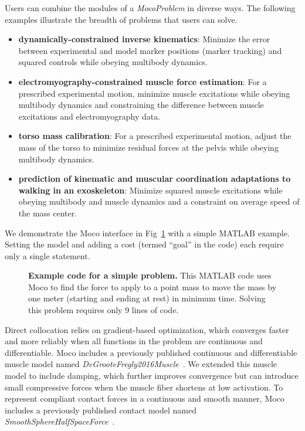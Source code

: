 \documentclass[10pt,letterpaper]{article}
\begin{document}
Users can combine the modules of a \textit{MocoProblem} in diverse ways. The following examples illustrate the breadth of problems that users can solve.
\begin{itemize}
\item \textbf{dynamically-constrained inverse kinematics}: Minimize the error between experimental and model marker positions (marker tracking) and squared controls while obeying multibody dynamics.
\item \textbf{electromyography-constrained muscle force estimation}: For a prescribed experimental motion, minimize muscle excitations while obeying multibody dynamics and constraining the difference between muscle excitations and electromyography data.
\item \textbf{torso mass calibration}: For a prescribed experimental motion, adjust the mass of the torso to minimize residual forces at the pelvis while obeying multibody dynamics.
\item \textbf{prediction of kinematic and muscular coordination adaptations to walking in an exoskeleton}: Minimize squared muscle excitations while obeying multibody and muscle dynamics and a constraint on average speed of the mass center.
\end{itemize}

We demonstrate the Moco interface in Fig~\ref{mocoexamplecode} with a simple MATLAB example. Setting the model and adding a cost (termed ``goal'' in the code) each require only a single statement.

\begin{figure}[!h]
    \centering
    \caption{{\bf Example code for a simple problem.}
        This MATLAB code uses Moco to find the force to apply to a point mass to move the mass by one meter (starting and ending at rest) in minimum time. Solving this problem requires only 9 lines of code.}
    \label{mocoexamplecode}
\end{figure}

Direct collocation relies on gradient-based optimization, which converges faster and more reliably when all functions in the problem are continuous and differentiable. Moco includes a previously published continuous and differentiable muscle model named \textit{DeGrooteFregly2016Muscle}~\cite{Groote:2016dq}. We extended this muscle model to include damping, which further improves convergence but can introduce small compressive forces when the muscle fiber shortens at low activation. To represent compliant contact forces in a continuous and smooth manner, Moco includes a previously published contact model named \textit{SmoothSphereHalfSpaceForce}~\cite{Serrancoli:2019aa}.
\end{document}
